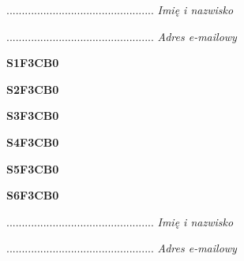 \begin{turn}{90}\begin{minipage}{\linewidth} \vspace{20mm} ................................................  \textit{Imię i nazwisko}\end{minipage}\end{turn}

\begin{turn}{90}\begin{minipage}{\linewidth} \vspace{20mm} ................................................  \textit{Adres e-mailowy}\end{minipage}\end{turn}

\begin{turn}{90}\huge \textbf{S1F3CB0}\end{turn}

\begin{turn}{90}\huge \textbf{S2F3CB0}\end{turn}

\begin{turn}{90}\huge \textbf{S3F3CB0}\end{turn}

\begin{turn}{90}\huge \textbf{S4F3CB0}\end{turn}

\begin{turn}{90}\huge \textbf{S5F3CB0}\end{turn}

\begin{turn}{90}\huge \textbf{S6F3CB0}\end{turn}

\begin{turn}{90}\begin{minipage}{\linewidth} \vspace{20mm} ................................................  \textit{Imię i nazwisko}\end{minipage}\end{turn}

\begin{turn}{90}\begin{minipage}{\linewidth} \vspace{20mm} ................................................  \textit{Adres e-mailowy}\end{minipage}\end{turn}

